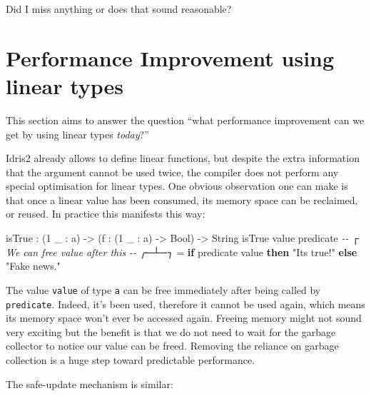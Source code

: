 \documentclass[
]{article}
\newenvironment{Shaded}{}{}
\newcommand{\CommentTok}[1]{\textcolor[rgb]{0.38,0.63,0.69}{\textit{#1}}}
\newcommand{\DataTypeTok}[1]{\textcolor[rgb]{0.56,0.13,0.00}{#1}}
\newcommand{\DecValTok}[1]{\textcolor[rgb]{0.25,0.63,0.44}{#1}}
\newcommand{\KeywordTok}[1]{\textcolor[rgb]{0.00,0.44,0.13}{\textbf{#1}}}
\newcommand{\NormalTok}[1]{#1}
\newcommand{\OperatorTok}[1]{\textcolor[rgb]{0.40,0.40,0.40}{#1}}
\newcommand{\OtherTok}[1]{\textcolor[rgb]{0.00,0.44,0.13}{#1}}
\newcommand{\StringTok}[1]{\textcolor[rgb]{0.25,0.44,0.63}{#1}}
\begin{document}
Did I miss anything or does that sound reasonable?

\newpage

\hypertarget{performance-improvement-using-linear-types}{%
\section{Performance Improvement using linear
types}\label{performance-improvement-using-linear-types}}

This section aims to answer the question ``what performance improvement
can we get by using linear types \emph{today}?''

Idris2 already allows to define linear functions, but despite the extra
information that the argument cannot be used twice, the compiler does
not perform any special optimisation for linear types. One obvious
observation one can make is that once a linear value has been consumed,
its memory space can be reclaimed, or reused. In practice this manifests
this way:

\begin{Shaded}
\begin{Highlighting}[]
\NormalTok{isTrue }\OperatorTok{:}\NormalTok{ (}\DecValTok{1}\NormalTok{ \_ }\OperatorTok{:}\NormalTok{ a) }\OtherTok{{-}\textgreater{}}\NormalTok{ (f }\OperatorTok{:}\NormalTok{ (}\DecValTok{1}\NormalTok{ \_ }\OperatorTok{:}\NormalTok{ a) }\OtherTok{{-}\textgreater{}} \DataTypeTok{Bool}\NormalTok{) }\OtherTok{{-}\textgreater{}} \DataTypeTok{String}
\NormalTok{isTrue value predicate}
\CommentTok{{-}{-}                 ┌ We can free \textasciigrave{}value\textasciigrave{} after this}
\CommentTok{{-}{-}               ╭─┴─╮}
  \OtherTok{=} \KeywordTok{if}\NormalTok{ predicate value }\KeywordTok{then} \StringTok{"It\textquotesingle{}s true!"}
                       \KeywordTok{else} \StringTok{"Fake news."}
\end{Highlighting}
\end{Shaded}

The value \texttt{value} of type \texttt{a} can be free immediately
after being called by \texttt{predicate}. Indeed, it's been used,
therefore it cannot be used again, which means its memory space won't
ever be accessed again. Freeing memory might not sound very exciting but
the benefit is that we do not need to wait for the garbage collector to
notice our value can be freed. Removing the reliance on garbage
collection is a huge step toward predictable performance.

The safe-update mechanism is similar:
\end{document}

